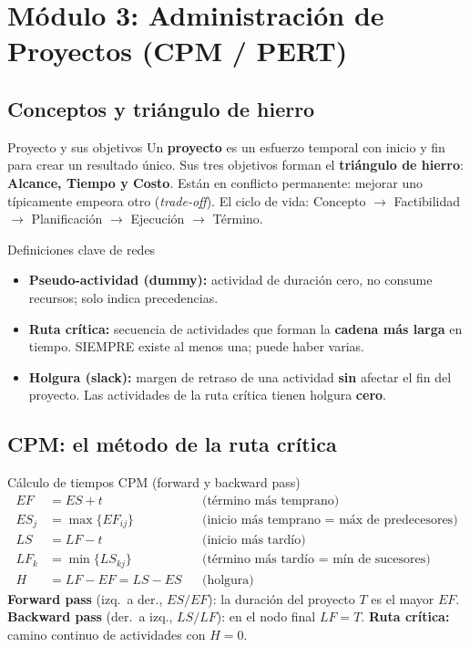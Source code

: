 \section{Módulo 3: Administración de Proyectos (CPM / PERT)}

\subsection{Conceptos y triángulo de hierro}

\begin{definicion}{Proyecto y sus objetivos}
Un \textbf{proyecto} es un esfuerzo temporal con inicio y fin para crear un resultado único. Sus tres objetivos forman el \textbf{triángulo de hierro}: \textbf{Alcance, Tiempo y Costo}. Están en conflicto permanente: mejorar uno típicamente empeora otro (\textit{trade-off}). El ciclo de vida: Concepto $\to$ Factibilidad $\to$ Planificación $\to$ Ejecución $\to$ Término.
\end{definicion}

\begin{definicion}{Definiciones clave de redes}
\begin{itemize}[leftmargin=1.4em, itemsep=1pt]
  \item \textbf{Pseudo-actividad (dummy):} actividad de duración cero, no consume recursos; solo indica precedencias.
  \item \textbf{Ruta crítica:} secuencia de actividades que forman la \textbf{cadena más larga} en tiempo. SIEMPRE existe al menos una; puede haber varias.
  \item \textbf{Holgura (slack):} margen de retraso de una actividad \textbf{sin} afectar el fin del proyecto. Las actividades de la ruta crítica tienen holgura \textbf{cero}.
\end{itemize}
\end{definicion}

\subsection{CPM: el método de la ruta crítica}

\begin{formulas}{Cálculo de tiempos CPM (forward y backward pass)}
\begin{align*}
  EF &= ES + t && \text{(término más temprano)}\\
  ES_j &= \max\{EF_{ij}\} && \text{(inicio más temprano = máx de predecesores)}\\
  LS &= LF - t && \text{(inicio más tardío)}\\
  LF_k &= \min\{LS_{kj}\} && \text{(término más tardío = mín de sucesores)}\\
  H &= LF - EF = LS - ES && \text{(holgura)}
\end{align*}
\textbf{Forward pass} (izq.\ a der., $ES/EF$): la duración del proyecto $T$ es el mayor $EF$. \textbf{Backward pass} (der.\ a izq., $LS/LF$): en el nodo final $LF=T$. \textbf{Ruta crítica:} camino continuo de actividades con $H=0$.
\end{formulas}

